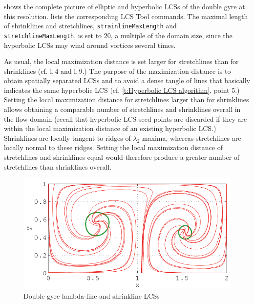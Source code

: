 \documentclass{article}
\begin{document}
 shows the complete picture of elliptic and hyperbolic LCSs of the double gyre at this resolution.  lists the corresponding LCS Tool commands. The maximal length of shrinklines and stretchlines, \lstinline!strainlineMaxLength! and \lstinline!stretchlineMaxLength!, is set to $20$, a multiple of the domain size, since the hyperbolic LCSs may wind around vortices several times. 

As usual, the local maximization distance is set larger for stretchlines than for shrinklines (cf. l.\,4 and l.\,9.) The purpose of the maximization distance is to obtain spatially separated LCSs and to avoid a dense tangle of lines that basically indicates the same hyperbolic LCS (cf. \cref{t:Hyperbolic LCS algorithm}, point 5.) Setting the local maximization distance for stretchlines larger than for shrinklines allows obtaining a comparable number of stretchlines and shrinklines overall in the flow domain (recall that hyperbolic LCS seed points are discarded if they are within the local maximization distance of an existing hyperbolic LCS.) Shrinklines are locally tangent to ridges of $\lambda_2$ maxima, whereas stretchlines are locally normal to these ridges. Setting the local maximization distance of stretchlines and shrinklines equal would therefore produce a greater number of stretchlines than shrinklines overall.



\begin{figure}
\centering
\includegraphics[width=\textwidth]{graphics/double_gyre/lambda_strain_lcs}
\caption{Double gyre lambda-line and shrinkline LCSs}
\label{fig:double_gyre_lambda_strain_lcs}
\end{figure}
\end{document}
